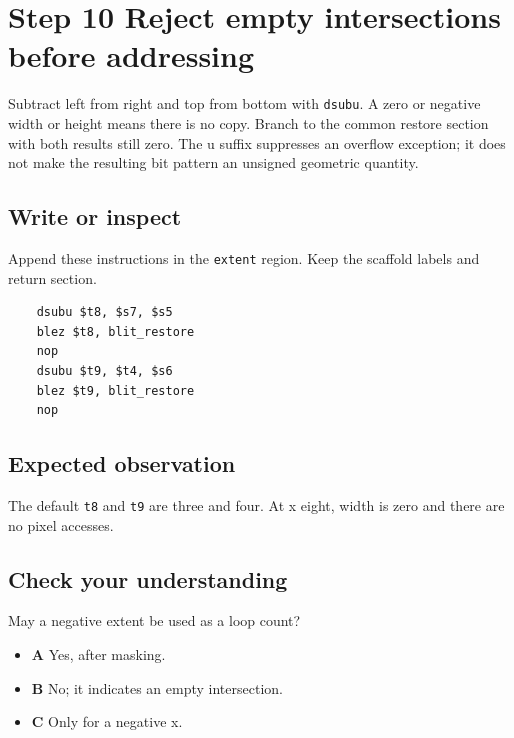 \section{Step 10 Reject empty intersections before addressing}\label{blit-s10}

Subtract left from right and top from bottom with \texttt{dsubu}. A zero or negative width or height means there is no copy. Branch to the common restore section with both results still zero. The u suffix suppresses an overflow exception; it does not make the resulting bit pattern an unsigned geometric quantity.

\subsection{Write or inspect}
Append these instructions in the \texttt{extent} region. Keep the scaffold labels and return section.

\begin{verbatim}
    dsubu $t8, $s7, $s5
    blez $t8, blit_restore
    nop
    dsubu $t9, $t4, $s6
    blez $t9, blit_restore
    nop
\end{verbatim}

\subsection{Expected observation}
The default \texttt{t8} and \texttt{t9} are three and four. At x eight, width is zero and there are no pixel accesses.

\subsection{Check your understanding}
May a negative extent be used as a loop count?

\begin{itemize}
  \item \textbf{A} Yes, after masking.
  \item \textbf{B} No; it indicates an empty intersection.
  \item \textbf{C} Only for a negative x.
\end{itemize}
